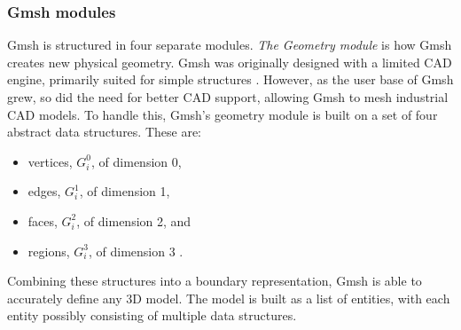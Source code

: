 \subsubsection{Gmsh modules}
\label{sec:gmsh-modules}
Gmsh is structured in four separate modules. \emph{The Geometry module} is how Gmsh creates new physical geometry. Gmsh was originally designed with a limited CAD engine, primarily suited for simple structures \cite{Gmsh_article}. However, as the user base of Gmsh grew, so did the need for better CAD support, allowing Gmsh to mesh industrial CAD models. To handle this, Gmsh's geometry module is built on a set of four abstract data structures. These are:
\begin{itemize}
    \item vertices, $G_i^0$, of dimension 0,
    \item edges, $G_i^1$, of dimension 1,
    \item faces, $G_i^2$, of dimension 2, and
    \item regions, $G_i^3$, of dimension 3 \cite{Gmsh_article}.
\end{itemize}
Combining these structures into a boundary representation, Gmsh is able to accurately define any 3D model. The model is built as a list of entities, with each entity possibly consisting of multiple data structures.

